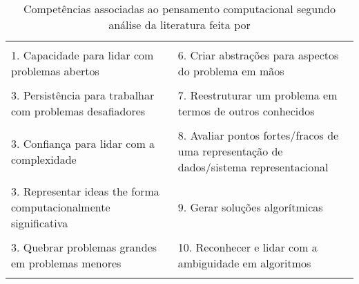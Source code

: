 
\begin{table}[htb]
  \caption{Competências associadas ao pensamento computacional segundo análise da literatura feita por }
  \label{tab:ten-skills}

  \begin{center}
    \begin{tabularx}{\textwidth}{XX}
      \hline
      \\
      1. Capacidade para lidar com problemas abertos & 6. Criar abstrações para aspectos do problema em mãos 
      \\
      
      \\
      3. Persistência para trabalhar com problemas desafiadores & 7. Reestruturar um problema em termos de outros conhecidos 
      \\

      \\
      3. Confiança para lidar com a complexidade & 8. Avaliar pontos fortes/fracos de uma representação de dados/sistema representacional
      \\

      \\
      3. Representar ideas the forma computacionalmente significativa & 9. Gerar soluções algorítmicas
      \\

      \\
      3. Quebrar problemas grandes em problemas menores & 10. Reconhecer e lidar com a ambiguidade em algoritmos
      \\\\
      \hline
    \end{tabularx}
  \end{center}
\end{table}
